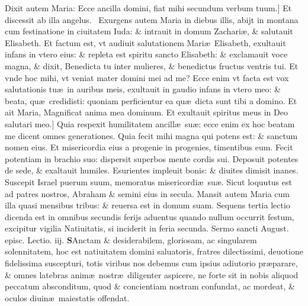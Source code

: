 \documentclass[a5paper,10pt]{book}
\def\leftmarginnote{%
	\lrmarginnote{\hskip -\marginparsep \hskip -6.5em}}
\def\ae{æ}
\begin{document}
\begin{multicols*}{2}
Dixit autem Maria: Ecce ancilla domini, fiat mihi secundum verbum tuum.]
Et\leftmarginnote{\begin{flushright}D\end{flushright}} discessit ab illa angelus. \textdagger \ 
Exurgens autem Maria in diebus illis, abijt in montana cum festinatione in ciuitatem Iuda: \& intrauit in domum Zachari\ae , \& salutauit Elisabeth.
Et factum est, vt audiuit salutationem Mari\ae \ Elisabeth, exultauit infans in vtero eius: \& repleta est spiritu sancto Elisabeth: \& exclamauit voce magna, \& dixit, Benedicta tu inter mulieres, \& benedictus fructus ventris tui.
Et vnde hoc mihi, vt veniat mater domini mei ad me?
Ecce enim vt facta est vox salutationis tu\ae \ in auribus meis, exultauit in gaudio infans in vtero meo: \& beata, qu\ae \ credidisti: quoniam perficientur ea qu\ae \ dicta sunt tibi a domino.
Et ait Maria, Magnificat anima mea dominum.
Et exultauit spiritus meus in Deo salutari meo.]
Quia\leftmarginnote{\begin{flushright}E\end{flushright}} respexit humilitatem ancill\ae \ su\ae : ecce enim ex hoc beatam me dicent omnes generationes.
Quia fecit mihi magna qui potens est: \& sanctum nomen eius.
Et misericordia eius a progenie in progenies, timentibus eum.
Fecit potentiam in brachio suo: dispersit superbos mente cordis sui.
Deposuit potentes de sede, \& exaltauit humiles.
Esurientes impleuit bonis: \& diuites dimisit inanes.
Suscepit Israel puerum suum, memoratus misericordi\ae \ su\ae .
Sicut loquutus est ad patres nostros, Abraham \& semini eius in secula.
Mansit autem Maria cum illa quasi mensibus tribus: \& reuersa est in domum suam.
\newline {} \color{red} Sequens tertia lectio dicenda est in omnibus secundis ferijs aduentus quando nullum occurrit festum, excipitur vigilia Natiuitatis, si inciderit in feria secunda. \color{black}
\newline \color{red} Sermo sancti August. episc. Lectio. iij. \color{black}
\vspace{-1.5em}
\lettrine[lines=2]{\bfseries \color{red} S}{}Anctam \& desiderabilem, gloriosam, ac singularem solennitatem, hoc est natiuitatem domini saluatoris, fratres dilectissimi, deuotione fidelissima suscepturi, totis viribus nos debemus cum ipsius adiutorio pr\ae parare, \& omnes latebras anim\ae \ nostr\ae \ diligenter aspicere, ne forte sit in nobis aliquod peccatum absconditum, quod \& concientiam nostram confundat, ac mordeat, \& oculos diuin\ae \ maiestatis offendat.

\end{multicols*}
\end{document}
